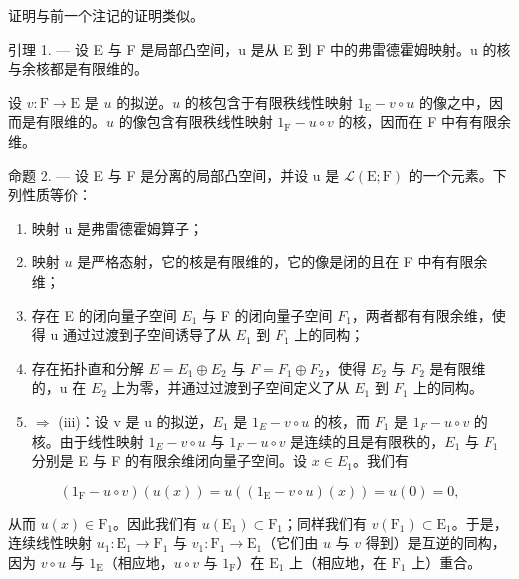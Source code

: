 证明与前一个注记的证明类似。

引理 1. --- 设 E 与 F 是局部凸空间，u 是从 E 到 F 中的弗雷德霍姆映射。u 的核与余核都是有限维的。

设 \(v \colon \mathrm{F} \to \mathrm{E}\) 是 \(u\) 的拟逆。\(u\) 的核包含于有限秩线性映射 \(1_{\mathrm{E}} - v \circ u\) 的像之中，因而是有限维的。\(u\) 的像包含有限秩线性映射 \(1_{\mathrm{F}} - u \circ v\) 的核，因而在 F 中有有限余维。

命题 2. — 设 E 与 F 是分离的局部凸空间，并设 u 是 \(\mathcal{L}(\mathrm{E};\mathrm{F})\) 的一个元素。下列性质等价：

\begin{enumerate}
\def\labelenumi{(\roman{enumi})}
\item
  映射 u 是弗雷德霍姆算子；
\item
  映射 \(u\) 是严格态射，它的核是有限维的，它的像是闭的且在 F 中有有限余维；
\item
  存在 E 的闭向量子空间 \(E_{1}\) 与 F 的闭向量子空间 \(F_{1}\)，两者都有有限余维，使得 u 通过过渡到子空间诱导了从 \(E_{1}\) 到 \(F_{1}\) 上的同构；
\item
   存在拓扑直和分解 \(E = E_{1} \oplus E_{2}\) 与 \(F = F_{1} \oplus F_{2}\)，使得 \(E_{2}\) 与 \(F_{2}\) 是有限维的，u 在 \(E_{2}\) 上为零，并通过过渡到子空间定义了从 \(E_{1}\) 到 \(F_{1}\) 上的同构。
\item
  \(\Longrightarrow\) (iii)：设 v 是 u 的拟逆，\(E_{1}\) 是 \(1_{E}-v\circ u\) 的核，而 \(F_{1}\) 是 \(1_{F}-u\circ v\) 的核。由于线性映射 \(1_{E}-v\circ u\) 与 \(1_{F}-u\circ v\) 是连续的且是有限秩的，\(E_{1}\) 与 \(F_{1}\) 分别是 E 与 F 的有限余维闭向量子空间。设 \(x\in E_{1}\)。我们有
\end{enumerate}

\[
(1 _ {\mathrm{F}} - u \circ v) (u (x)) = u ((1 _ {\mathrm{E}} - v \circ u) (x)) = u (0) = 0,
\]

从而 \(u(x) \in \mathrm{F}_1\)。因此我们有 \(u(\mathrm{E}_1) \subset \mathrm{F}_1\)；同样我们有 \(v(\mathrm{F}_1) \subset \mathrm{E}_1\)。于是，连续线性映射 \(u_1: \mathrm{E}_1 \to \mathrm{F}_1\) 与 \(v_1: \mathrm{F}_1 \to \mathrm{E}_1\)（它们由 \(u\) 与 \(v\) 得到）是互逆的同构，因为 \(v \circ u\) 与 \(1_{\mathrm{E}}\)（相应地，\(u \circ v\) 与 \(1_{\mathrm{F}}\)）在 \(\mathrm{E}_1\) 上（相应地，在 \(\mathrm{F}_1\) 上）重合。


